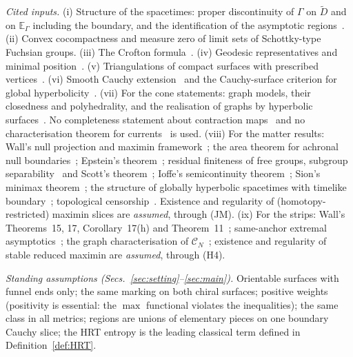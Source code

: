 \documentclass[aps,prd,onecolumn,superscriptaddress,nofootinbib,amsmath,amssymb,11pt]{revtex4-2}
\theoremstyle{definition}
\newcommand{\CN}{\mathcal{C}_N}
\newcommand{\Dt}{\tilde D}
\newcommand{\EG}{\mathbb{E}_\Gamma}
\begin{document}
\emph{Cited inputs.} (i) Structure of the spacetimes: proper discontinuity of $\Gamma$ on $\Dt$ and on $\EG$ including the boundary,
and the identification of the asymptotic regions~\cite{Mess2007,Barbot2008,BKS2011}. (ii) Convex cocompactness and measure zero of
limit sets of Schottky-type Fuchsian groups. (iii) The Crofton formula~\cite{Santalo1976}. (iv) Geodesic representatives and minimal
position~\cite{Epstein1966,FarbMargalit2012}. (v) Triangulations of compact surfaces with prescribed vertices~\cite{Hatcher1991}.
(vi) Smooth Cauchy extension~\cite{BernalSanchez2006} and the Cauchy-surface criterion for global hyperbolicity~\cite{Geroch1970}.
(vii) For the cone statements: graph models, their closedness and polyhedrality, and the realisation of graphs by hyperbolic
surfaces~\cite{Bao2015}. No completeness statement about contraction maps~\cite{BaoFuruyaNaskar2025} and no characterisation theorem
for currents~\cite{MartinezGranadoThurston2026} is used. (viii) For the matter results: Wall's null projection and maximin
framework~\cite{Wall2014,MarolfWallWang2019}; the area theorem for achronal null boundaries~\cite{CDGH2001}; Epstein's
theorem~\cite{Epstein1966}; residual finiteness of free groups, subgroup separability~\cite{Hall1949} and Scott's
theorem~\cite{Scott1978}; Ioffe's semicontinuity theorem~\cite{Ioffe1977}; Sion's minimax theorem~\cite{Sion1958}; the
structure of globally hyperbolic spacetimes with timelike boundary~\cite{AkeFloresSanchez2021}; topological
censorship~\cite{GSWW1999}. Existence and regularity of (homotopy-restricted) maximin slices are \emph{assumed}, through (JM).
(ix) For the strips: Wall's Theorems~15, 17, Corollary~17(h) and Theorem~11~\cite{Wall2014}; same-anchor extremal
asymptotics~\cite{Sorce2019}; the graph characterisation of $\CN$~\cite{Bao2015}; existence and regularity of stable reduced
maximin are \emph{assumed}, through (H4).

\emph{Standing assumptions (Secs.~\ref{sec:setting}--\ref{sec:main}).} Orientable surfaces with funnel ends only; the same marking on both chiral surfaces; positive weights
(positivity is essential: the $\max$ functional violates the inequalities); the same class in all metrics; regions are unions of
elementary pieces on one boundary Cauchy slice; the HRT entropy is the leading classical term defined in
Definition~\ref{def:HRT}.



\end{document}
